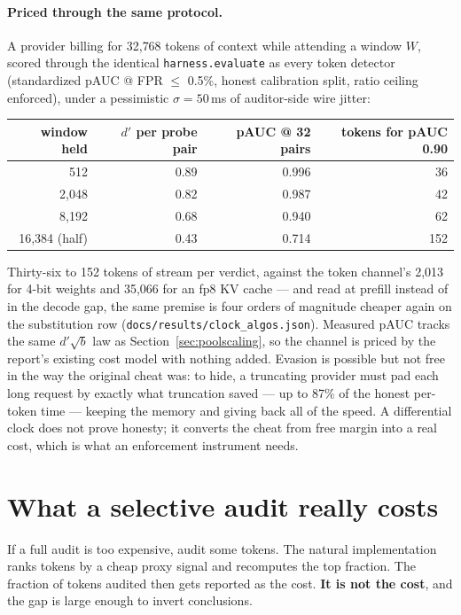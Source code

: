 \documentclass[11pt]{article}
\begin{document}
\paragraph{Priced through the same protocol.} A provider billing for 32{,}768
tokens of context while attending a window $W$, scored through the identical
\texttt{harness.evaluate} as every token detector (standardized pAUC @ FPR $\le$
0.5\%, honest calibration split, ratio ceiling enforced), under a pessimistic
$\sigma = 50$\,ms of auditor-side wire jitter:

\begin{center}\small
\begin{tabular}{rrrr}
\toprule
window held & $d'$ per probe pair & pAUC @ 32 pairs & tokens for pAUC 0.90 \\
\midrule
512            & 0.89 & 0.996 & 36 \\
2{,}048        & 0.82 & 0.987 & 42 \\
8{,}192        & 0.68 & 0.940 & 62 \\
16{,}384 (half) & 0.43 & 0.714 & 152 \\
\bottomrule
\end{tabular}
\end{center}

\noindent Thirty-six to 152 tokens of stream per verdict, against the token
channel's 2{,}013 for 4-bit weights and 35{,}066 for an fp8 KV cache --- and read
at prefill instead of in the decode gap, the same premise is four orders of
magnitude cheaper again on the substitution row
(\texttt{docs/results/clock\_algos.json}). Measured pAUC tracks the same
$d'\sqrt{b}$ law as Section~\ref{sec:poolscaling}, so the channel is priced by the
report's existing cost model with nothing added. Evasion is possible but not
free in the way the original cheat was: to hide, a truncating provider must pad
each long request by exactly what truncation saved --- up to 87\% of the honest
per-token time --- keeping the memory and giving back all of the speed. A
differential clock does not prove honesty; it converts the cheat from free margin
into a real cost, which is what an enforcement instrument needs.

\section{What a selective audit really costs}
\label{sec:cost}

If a full audit is too expensive, audit some tokens. The natural implementation ranks
tokens by a cheap proxy signal and recomputes the top fraction. The fraction of tokens
audited then gets reported as the cost. \textbf{It is not the cost}, and the gap is
large enough to invert conclusions.
\end{document}
